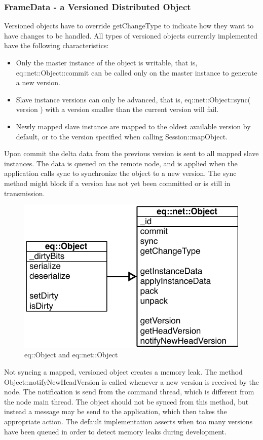 \documentclass[10pt,a4]{scrartcl}
\begin{document}
\subsubsection{FrameData - a Versioned Distributed Object}

Versioned objects have to override \textsf{getChangeType} to indicate
how they want to have changes to be handled. All types of versioned
objects currently implemented have the following characteristics:

\begin{itemize}
\item Only the master instance of the object is writable, that is,
  \textsf{eq::net::Object::com\-mit} can be called only on the master
  instance to generate a new version.
\item Slave instance versions can only be advanced, that is,
  \textsf{eq::net::Object::sync( version )} with a version smaller than
  the current version will fail.
\item Newly mapped slave instance are mapped to the oldest available
  version by default, or to the version specified when calling
  \textsf{Session::mapObject}.
\end{itemize}

Upon \textsf{commit} the delta data from the previous version is sent to
all mapped slave instances. The data is queued on the remote node, and
is applied when the application calls \textsf{sync} to synchronize the
object to a new version. The \textsf{sync} method might block if a
version has not yet been committed or is still in transmission.

\begin{figure}
  \includegraphics[width=.382\textwidth]{images/umlObject.pdf}
  {\caption{\label{fUMLObject}eq::Object and eq::net::Object}}
\end{figure}
Not syncing a mapped, versioned object creates a memory leak. The method
\textsf{Object::notifyNewHeadVersion} is called whenever a new version
is received by the node. The notification is send from the command
thread, which is different from the node main thread. The object should
not be synced from this method, but instead a message may be send to the
application, which then takes the appropriate action. The default
implementation asserts when too many versions have been queued in order
to detect memory leaks during development.
\end{document}
